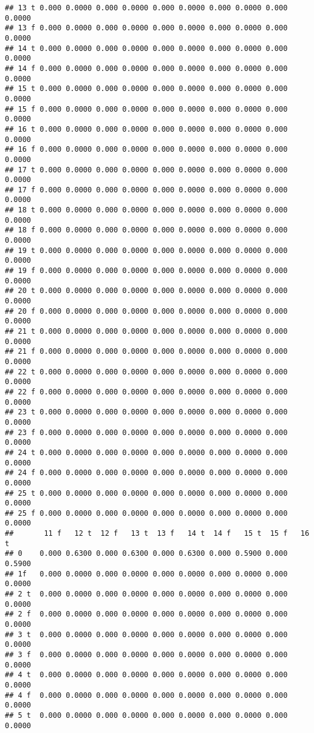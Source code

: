 \documentclass[]{article}
\begin{document}
\begin{verbatim}
## 13 t 0.000 0.0000 0.000 0.0000 0.000 0.0000 0.000 0.0000 0.000 0.0000
## 13 f 0.000 0.0000 0.000 0.0000 0.000 0.0000 0.000 0.0000 0.000 0.0000
## 14 t 0.000 0.0000 0.000 0.0000 0.000 0.0000 0.000 0.0000 0.000 0.0000
## 14 f 0.000 0.0000 0.000 0.0000 0.000 0.0000 0.000 0.0000 0.000 0.0000
## 15 t 0.000 0.0000 0.000 0.0000 0.000 0.0000 0.000 0.0000 0.000 0.0000
## 15 f 0.000 0.0000 0.000 0.0000 0.000 0.0000 0.000 0.0000 0.000 0.0000
## 16 t 0.000 0.0000 0.000 0.0000 0.000 0.0000 0.000 0.0000 0.000 0.0000
## 16 f 0.000 0.0000 0.000 0.0000 0.000 0.0000 0.000 0.0000 0.000 0.0000
## 17 t 0.000 0.0000 0.000 0.0000 0.000 0.0000 0.000 0.0000 0.000 0.0000
## 17 f 0.000 0.0000 0.000 0.0000 0.000 0.0000 0.000 0.0000 0.000 0.0000
## 18 t 0.000 0.0000 0.000 0.0000 0.000 0.0000 0.000 0.0000 0.000 0.0000
## 18 f 0.000 0.0000 0.000 0.0000 0.000 0.0000 0.000 0.0000 0.000 0.0000
## 19 t 0.000 0.0000 0.000 0.0000 0.000 0.0000 0.000 0.0000 0.000 0.0000
## 19 f 0.000 0.0000 0.000 0.0000 0.000 0.0000 0.000 0.0000 0.000 0.0000
## 20 t 0.000 0.0000 0.000 0.0000 0.000 0.0000 0.000 0.0000 0.000 0.0000
## 20 f 0.000 0.0000 0.000 0.0000 0.000 0.0000 0.000 0.0000 0.000 0.0000
## 21 t 0.000 0.0000 0.000 0.0000 0.000 0.0000 0.000 0.0000 0.000 0.0000
## 21 f 0.000 0.0000 0.000 0.0000 0.000 0.0000 0.000 0.0000 0.000 0.0000
## 22 t 0.000 0.0000 0.000 0.0000 0.000 0.0000 0.000 0.0000 0.000 0.0000
## 22 f 0.000 0.0000 0.000 0.0000 0.000 0.0000 0.000 0.0000 0.000 0.0000
## 23 t 0.000 0.0000 0.000 0.0000 0.000 0.0000 0.000 0.0000 0.000 0.0000
## 23 f 0.000 0.0000 0.000 0.0000 0.000 0.0000 0.000 0.0000 0.000 0.0000
## 24 t 0.000 0.0000 0.000 0.0000 0.000 0.0000 0.000 0.0000 0.000 0.0000
## 24 f 0.000 0.0000 0.000 0.0000 0.000 0.0000 0.000 0.0000 0.000 0.0000
## 25 t 0.000 0.0000 0.000 0.0000 0.000 0.0000 0.000 0.0000 0.000 0.0000
## 25 f 0.000 0.0000 0.000 0.0000 0.000 0.0000 0.000 0.0000 0.000 0.0000
##       11 f   12 t  12 f   13 t  13 f   14 t  14 f   15 t  15 f   16 t
## 0    0.000 0.6300 0.000 0.6300 0.000 0.6300 0.000 0.5900 0.000 0.5900
## 1f   0.000 0.0000 0.000 0.0000 0.000 0.0000 0.000 0.0000 0.000 0.0000
## 2 t  0.000 0.0000 0.000 0.0000 0.000 0.0000 0.000 0.0000 0.000 0.0000
## 2 f  0.000 0.0000 0.000 0.0000 0.000 0.0000 0.000 0.0000 0.000 0.0000
## 3 t  0.000 0.0000 0.000 0.0000 0.000 0.0000 0.000 0.0000 0.000 0.0000
## 3 f  0.000 0.0000 0.000 0.0000 0.000 0.0000 0.000 0.0000 0.000 0.0000
## 4 t  0.000 0.0000 0.000 0.0000 0.000 0.0000 0.000 0.0000 0.000 0.0000
## 4 f  0.000 0.0000 0.000 0.0000 0.000 0.0000 0.000 0.0000 0.000 0.0000
## 5 t  0.000 0.0000 0.000 0.0000 0.000 0.0000 0.000 0.0000 0.000 0.0000

\end{verbatim}
\end{document}
